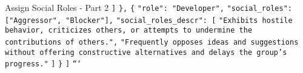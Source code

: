 \begin{figure*}[t]
\begin{AIbox}{Assign Social Roles - Part 2}
{        \quad \quad \texttt{]} \newline
        \quad \texttt{\},} \newline
        \quad \texttt{\{} \newline
        \quad \quad \texttt{"role": "Developer",} \newline
        \quad \quad \texttt{"social\_roles": ["Aggressor", "Blocker"],} \newline
        \quad \quad \texttt{"social\_roles\_descr": [} \newline
        \quad \quad \quad \texttt{"Exhibits hostile behavior, criticizes others, or attempts to undermine the contributions of others.",} \newline
        \quad \quad \quad \texttt{"Frequently opposes ideas and suggestions without offering constructive alternatives and delays the group's progress."} \newline
        \quad \quad \texttt{]} \newline
        \quad \texttt{\}} \newline
        \texttt{]} \newline
        \texttt{```} \newline
    }
    \end{AIbox}
    \caption{Prompt template for assigning social/group roles in meeting simulations (Part 2).}
    \label{fig:assign_social_roles_prompt_p2}
\end{figure*}

